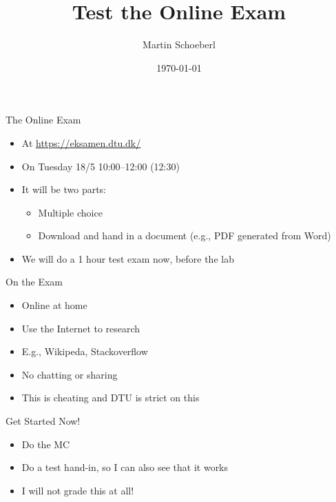 

\newif\ifbook


\title{Test the Online Exam}
\author{Martin Schoeberl}
\date{\today}



\begin{frame}
\titlepage
\end{frame}


\begin{frame}[fragile]{The Online Exam}
\begin{itemize}
\item At \url{https://eksamen.dtu.dk/}
\item On Tuesday 18/5 10:00--12:00 (12:30)
\item It will be two parts:
\begin{itemize}
\item Multiple choice
\item Download and hand in a document (e.g., PDF generated from Word)
\end{itemize}
\item We will do a 1 hour test exam now, before the lab
\end{itemize}
\end{frame}

\begin{frame}[fragile]{On the Exam}
\begin{itemize}
\item Online at home
\item Use the Internet to research
\item E.g., Wikipeda, Stackoverflow
\item No chatting or sharing
\item This is cheating and DTU is strict on this
\end{itemize}
\end{frame}

\begin{frame}[fragile]{Get Started Now!}
\begin{itemize}
\item Do the MC
\item Do a test hand-in, so I can also see that it works
\item I will not grade this at all!
\end{itemize}
\end{frame}




